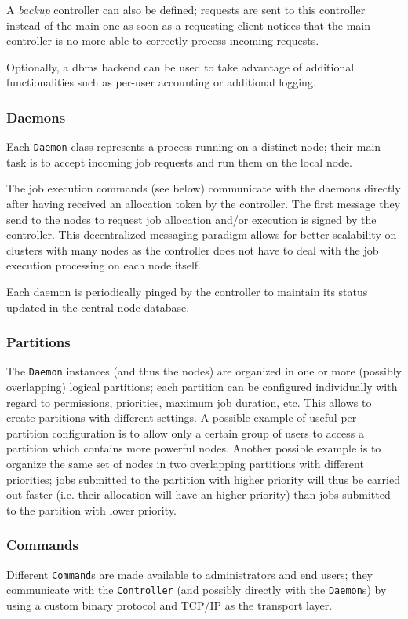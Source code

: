 A \emph{backup} controller can also be defined; requests are sent to this controller instead of the main one as soon as a requesting client notices that the main controller is no more able to correctly process incoming requests.

Optionally, a \gls{dbms} backend can be used to take advantage of additional functionalities such as per-user accounting or additional logging.

\subsubsection{Daemons}
Each \texttt{Daemon} class represents a process running on a distinct node; their main task is to accept incoming job requests and run them on the local node.

The job execution commands (see below) communicate with the daemons directly after having received an allocation token by the controller. The first message they send to the nodes to request job allocation and/or execution is signed by the controller. This decentralized messaging paradigm allows for better scalability on clusters with many nodes as the controller does not have to deal with the job execution processing on each node itself.

Each daemon is periodically pinged by the controller to maintain its status updated in the central node database.

\subsubsection{Partitions}
The \texttt{Daemon} instances (and thus the nodes) are organized in one or more (possibly overlapping) logical partitions; each partition can be configured individually with regard to permissions, priorities, maximum job duration, etc. This allows to create partitions with different settings. A possible example of useful per-partition configuration is to allow only a certain group of users to access a partition which contains more powerful nodes. Another possible example is to organize the same set of nodes in two overlapping partitions with different priorities; jobs submitted to the partition with higher priority will thus be carried out faster (i.e. their allocation will have an higher priority) than jobs submitted to the partition with lower priority.

\subsubsection{Commands}
Different \texttt{Command}s are made available to administrators and end users; they communicate with the \texttt{Controller} (and possibly directly with the \texttt{Daemon}s) by using a custom binary protocol and TCP/IP as the transport layer.

